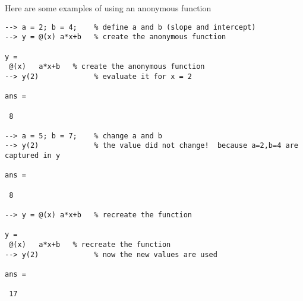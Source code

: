 Here are some examples of using an anonymous function
\begin{verbatim}
--> a = 2; b = 4;    % define a and b (slope and intercept)
--> y = @(x) a*x+b   % create the anonymous function

y = 
 @(x)   a*x+b   % create the anonymous function
--> y(2)             % evaluate it for x = 2

ans = 

 8 

--> a = 5; b = 7;    % change a and b
--> y(2)             % the value did not change!  because a=2,b=4 are captured in y

ans = 

 8 

--> y = @(x) a*x+b   % recreate the function

y = 
 @(x)   a*x+b   % recreate the function
--> y(2)             % now the new values are used

ans = 

 17 
\end{verbatim}
